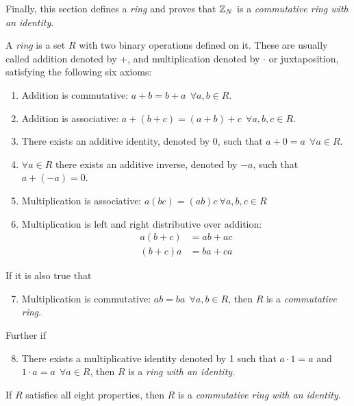 \par Finally, this section defines a {\em ring} \cite{bk:fgr12} and proves
that $\mathbb{Z}_N$ is a {\em commutative ring with an identity}.
\begin{definition}
\label{def:ring}
  A {\em ring} is a set $R$ with two binary operations defined on it. These are usually
  called addition denoted by +, and multiplication denoted by $\cdot$ or juxtaposition,
  satisfying the following six axioms:
  \begin{enumerate}
    \item Addition is commutative: $a+b=b+a \ \ \forall a,b \in R$.
    \item Addition is associative: $a+(b+c)=(a+b)+c \ \ \forall a,b,c \in R$.
    \item There exists an additive identity, denoted by 0, such that $a+0=a \ \ \forall a \in R$.
    \item $\forall a \in R$ there exists an additive inverse, denoted by $-a$, such
      that $a+(-a)=0$.
    \item Multiplication is associative: $a(bc)=(ab)c \ \forall a,b,c \in R$
    \item Multiplication is left and right distributive over addition:
      \begin{align*}
        a(b+c)&=ab+ac \\
        (b+c)a&=ba+ca
      \end{align*}
  \end{enumerate}
  If it is also true that
  \begin{enumerate}
      \setcounter{enumi}{6}
    \item Multiplication is commutative: $ab=ba \ \ \forall a,b \in R$, then
      $R$ is a {\em commutative ring}.
  \end{enumerate}
  Further if
  \begin{enumerate}
      \setcounter{enumi}{7}
    \item There exists a multiplicative identity denoted by 1 such that
      $a \cdot 1=a$ and $1 \cdot a=a \ \ \forall a \in R$, then $R$ is a
      {\em ring with an identity}.
  \end{enumerate}
  If $R$ satisfies all eight properties, then $R$ is a {\em commutative ring with
  an identity.}
\end{definition}

